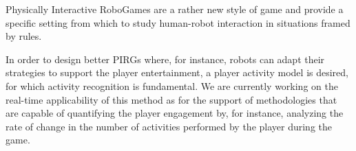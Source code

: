 Physically Interactive RoboGames are a rather new style of game and provide a specific setting from which to study human-robot interaction in situations framed by rules.

In order to design better PIRGs where, for instance, robots can adapt their strategies to support the player entertainment, a player activity model is desired, for which activity recognition is fundamental. We are currently working on the real-time applicability of this method as for the support of methodologies that are capable of quantifying the player engagement by, for instance, analyzing the rate of change in the number of activities performed by the player during the game.
